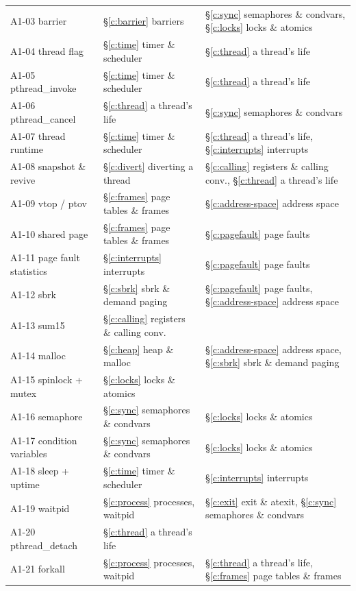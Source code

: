 \documentclass[11pt]{report}
\begin{document}
{\begin{longtable}{@{}L{5.2cm}L{4.3cm}L{6.4cm}@{}}
A1-03 barrier & \S\ref{c:barrier} barriers & \S\ref{c:sync} semaphores \& condvars, \S\ref{c:locks} locks \& atomics \\
A1-04 thread flag & \S\ref{c:time} timer \& scheduler & \S\ref{c:thread} a thread's life \\
A1-05 pthread\_invoke & \S\ref{c:time} timer \& scheduler & \S\ref{c:thread} a thread's life \\
A1-06 pthread\_cancel & \S\ref{c:thread} a thread's life & \S\ref{c:sync} semaphores \& condvars \\
A1-07 thread runtime & \S\ref{c:time} timer \& scheduler & \S\ref{c:thread} a thread's life, \S\ref{c:interrupts} interrupts \\
A1-08 snapshot \& revive & \S\ref{c:divert} diverting a thread & \S\ref{c:calling} registers \& calling conv., \S\ref{c:thread} a thread's life \\
A1-09 vtop / ptov & \S\ref{c:frames} page tables \& frames & \S\ref{c:address-space} address space \\
A1-10 shared page & \S\ref{c:frames} page tables \& frames & \S\ref{c:pagefault} page faults \\
A1-11 page fault statistics & \S\ref{c:interrupts} interrupts & \S\ref{c:pagefault} page faults \\
A1-12 sbrk & \S\ref{c:sbrk} sbrk \& demand paging & \S\ref{c:pagefault} page faults, \S\ref{c:address-space} address space \\
A1-13 sum15 & \S\ref{c:calling} registers \& calling conv. &  \\
A1-14 malloc & \S\ref{c:heap} heap \& malloc & \S\ref{c:address-space} address space, \S\ref{c:sbrk} sbrk \& demand paging \\
A1-15 spinlock + mutex & \S\ref{c:locks} locks \& atomics &  \\
A1-16 semaphore & \S\ref{c:sync} semaphores \& condvars & \S\ref{c:locks} locks \& atomics \\
A1-17 condition variables & \S\ref{c:sync} semaphores \& condvars & \S\ref{c:locks} locks \& atomics \\
A1-18 sleep + uptime & \S\ref{c:time} timer \& scheduler & \S\ref{c:interrupts} interrupts \\
A1-19 waitpid & \S\ref{c:process} processes, waitpid & \S\ref{c:exit} exit \& atexit, \S\ref{c:sync} semaphores \& condvars \\
A1-20 pthread\_detach & \S\ref{c:thread} a thread's life &  \\
A1-21 forkall & \S\ref{c:process} processes, waitpid & \S\ref{c:thread} a thread's life, \S\ref{c:frames} page tables \& frames \\

\end{longtable}}
\end{document}
